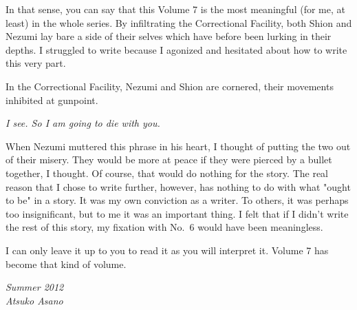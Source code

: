 In that sense, you can say that this Volume 7 is the most meaningful (for me, at least) in the whole series. By infiltrating the Correctional Facility, both Shion and Nezumi lay bare a side of their selves which have before been lurking in their depths. I struggled to write because I agonized and hesitated about how to write this very part.

In the Correctional Facility, Nezumi and Shion are cornered, their movements inhibited at gunpoint.

\emph{I see. So I am going to die with you.}

When Nezumi muttered this phrase in his heart, I thought of putting the two out of their misery. They would be more at peace if they were pierced by a bullet together, I thought. Of course, that would do nothing for the story. The real reason that I chose to write further, however, has nothing to do with what "ought to be" in a story. It was my own conviction as a writer. To others, it was perhaps too insignificant, but to me it was an important thing. I felt that if I didn't write the rest of this story, my fixation with No.~6 would have been meaningless.

I can only leave it up to you to read it as you will interpret it. Volume 7 has become that kind of volume.

\myspace

\emph{Summer 2012\\
	Atsuko Asano}